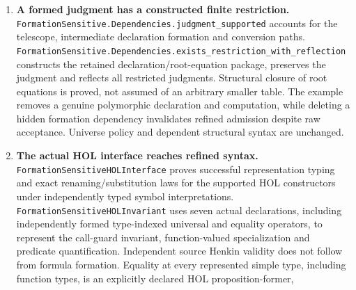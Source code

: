 \documentclass[11pt]{article}
\theoremstyle{definition}
\theoremstyle{remark}
\begin{document}
\begin{enumerate}
  The actual MIL eliminator now has a formed declaration and motive/branch
  types; its primitive/chain iota endpoints have refined judgments in formed
  canonical telescopes and through typed substitutions. A receipt-dependent
  consumer separates two displayed types at identical endpoint codes and
  rejects a crossed reduct. General primitive/chain typing preservation uses
  the package's independently proved Pi-conversion boundary; the actual
  contextual law is recorded below without remaining qualification premises.
  These results do not qualify arbitrary declaration computation or install
  a Prime kernel.
  The native List, identity and proof-relevant relator eliminators likewise
  have independently formed motives, declarations and branch endpoints
  under typed substitution. Declaration-rooted recovery yields general
  primitive preservation for all five roots; the actual conversion boundaries
  are discharged as recorded below. Redirected recursive evidence and changed
  identity endpoints fail the original root relation.
\item \textbf{A formed judgment has a constructed finite restriction.}
  \nolinkurl{FormationSensitive.Dependencies.judgment_supported} accounts for
  the telescope, intermediate declaration formation and conversion paths.
  \nolinkurl{FormationSensitive.Dependencies.exists_restriction_with_reflection}
  constructs the retained declaration/root-equation package, preserves the
  judgment and reflects all restricted judgments. Structural closure of root
  equations is proved, not assumed of an arbitrary smaller table. The example
  removes a genuine polymorphic declaration and computation, while deleting a
  hidden formation dependency invalidates refined admission despite raw
  acceptance. Universe policy and dependent structural syntax are unchanged.
\item \textbf{The actual HOL interface reaches refined syntax.}
  \nolinkurl{FormationSensitiveHOLInterface} proves successful representation
  typing and exact renaming/substitution laws for the supported HOL
  constructors under independently typed symbol interpretations.
  \nolinkurl{FormationSensitiveHOLInvariant} uses seven actual declarations,
  including independently formed type-indexed universal and equality operators, to
  represent the call-guard invariant, function-valued specialization and
  predicate quantification. Independent source Henkin validity does not
  follow from formula formation. Equality at every represented simple type,
  including function types, is an explicitly declared HOL proposition-former,

\end{enumerate}
\end{document}
